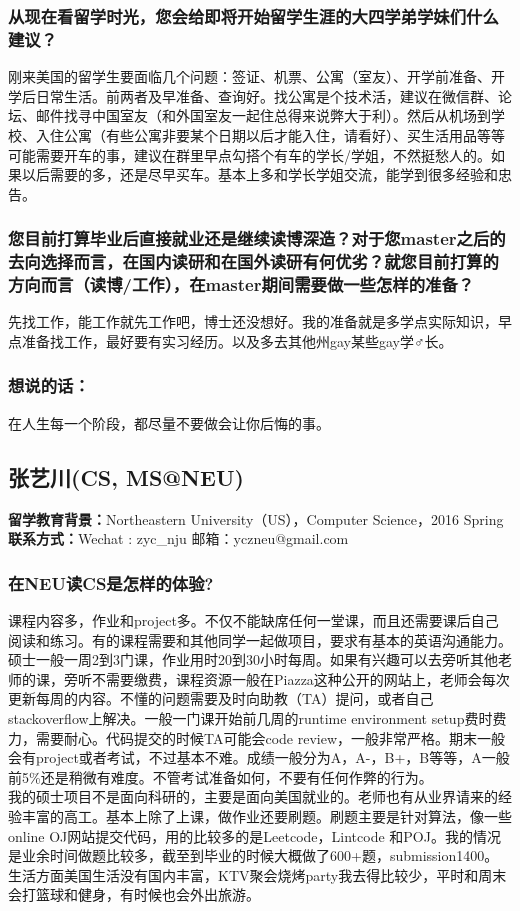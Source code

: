 \documentclass[a4paper,UTF8]{book}
\begin{document}
    \subsubsection*{从现在看留学时光，您会给即将开始留学生涯的大四学弟学妹们什么建议？}
    刚来美国的留学生要面临几个问题：签证、机票、公寓（室友）、开学前准备、开学后日常生活。前两者及早准备、查询好。找公寓是个技术活，建议在微信群、论坛、邮件找寻中国室友（和外国室友一起住总得来说弊大于利）。然后从机场到学校、入住公寓（有些公寓非要某个日期以后才能入住，请看好）、买生活用品等等可能需要开车的事，建议在群里早点勾搭个有车的学长/学姐，不然挺愁人的。如果以后需要的多，还是尽早买车。基本上多和学长学姐交流，能学到很多经验和忠告。

    \subsubsection*{您目前打算毕业后直接就业还是继续读博深造？对于您master之后的去向选择而言，在国内读研和在国外读研有何优劣？就您目前打算的方向而言（读博/工作），在master期间需要做一些怎样的准备？}
    先找工作，能工作就先工作吧，博士还没想好。我的准备就是多学点实际知识，早点准备找工作，最好要有实习经历。以及多去其他州gay某些gay学$\male$长。

    \subsubsection{想说的话：}
    在人生每一个阶段，都尽量不要做会让你后悔的事。

\clearpage
\subsection{张艺川(CS, MS@NEU)}
    \textbf{留学教育背景：}Northeastern University（US），Computer Science，2016 Spring\\
    \textbf{联系方式：}Wechat : zyc\_nju  邮箱：yczneu@gmail.com

    \subsubsection*{在NEU读CS是怎样的体验?}
    课程内容多，作业和project多。不仅不能缺席任何一堂课，而且还需要课后自己阅读和练习。有的课程需要和其他同学一起做项目，要求有基本的英语沟通能力。硕士一般一周2到3门课，作业用时20到30小时每周。如果有兴趣可以去旁听其他老师的课，旁听不需要缴费，课程资源一般在Piazza这种公开的网站上，老师会每次更新每周的内容。不懂的问题需要及时向助教（TA）提问，或者自己stackoverflow上解决。一般一门课开始前几周的runtime environment setup费时费力，需要耐心。代码提交的时候TA可能会code review，一般非常严格。期末一般会有project或者考试，不过基本不难。成绩一般分为A，A-，B+，B等等，A一般前5\%还是稍微有难度。不管考试准备如何，不要有任何作弊的行为。\\
    我的硕士项目不是面向科研的，主要是面向美国就业的。老师也有从业界请来的经验丰富的高工。基本上除了上课，做作业还要刷题。刷题主要是针对算法，像一些online OJ网站提交代码，用的比较多的是Leetcode，Lintcode 和POJ。我的情况是业余时间做题比较多，截至到毕业的时候大概做了600+题，submission1400。
    生活方面美国生活没有国内丰富，KTV聚会烧烤party我去得比较少，平时和周末会打篮球和健身，有时候也会外出旅游。
\end{document}

